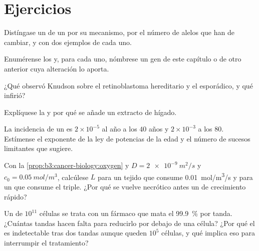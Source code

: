 \section{Ejercicios}

\begin{exercise}[$\star$]\label{exo:b3:cancer-biology:1}
Distíngase un  de un  por su mecanismo, por
el número de alelos que han de cambiar, y con dos ejemplos de cada uno.
\end{exercise}

\begin{exercise}[$\star$]\label{exo:b3:cancer-biology:2}
Enumérense los  y, para cada uno, nómbrese
un gen de este capítulo o de otro anterior cuya alteración lo aporta.
\end{exercise}

\begin{exercise}[$\star$]\label{exo:b3:cancer-biology:3}
¿Qué observó Knudson sobre el retinoblastoma hereditario y el esporádico,
y qué infirió?
\end{exercise}

\begin{exercise}[$\star$]\label{exo:b3:cancer-biology:4}
Explíquese la  y por qué se añade un extracto de hígado.
\end{exercise}

\begin{exercise}[$\star\star$]\label{exo:b3:cancer-biology:5}
La incidencia de un  es $2\times 10^{-5}$ al año a los $40$ años y
$2\times 10^{-3}$ a los $80$. Estímense el exponente de la ley de
potencias de la edad y el número de sucesos limitantes que sugiere.
\end{exercise}

\begin{exercise}[$\star\star$]\label{exo:b3:cancer-biology:6}
Con la \cref{prop:b3:cancer-biology:oxygen} y $D =
\qty{2e-9}{m^2/s}$ y $c_{0} = \qty{0.05}{mol/m^3}$, calcúlese $L$ para un
tejido que consume \qty{0.01}{mol/m^3/s} y para un  que consume el
triple. ¿Por qué se vuelve necrótico antes un  de crecimiento
rápido?
\end{exercise}

\begin{exercise}[$\star\star$]\label{exo:b3:cancer-biology:7}
Un  de $10^{11}$ células se trata con un fármaco que mata el
\qty{99.9}{\%} por tanda. ¿Cuántas tandas hacen falta para reducirlo por
debajo de una célula? ¿Por qué el  es indetectable tras dos tandas
aunque queden $10^{5}$ células, y qué implica eso para interrumpir el
tratamiento?
\end{exercise}

